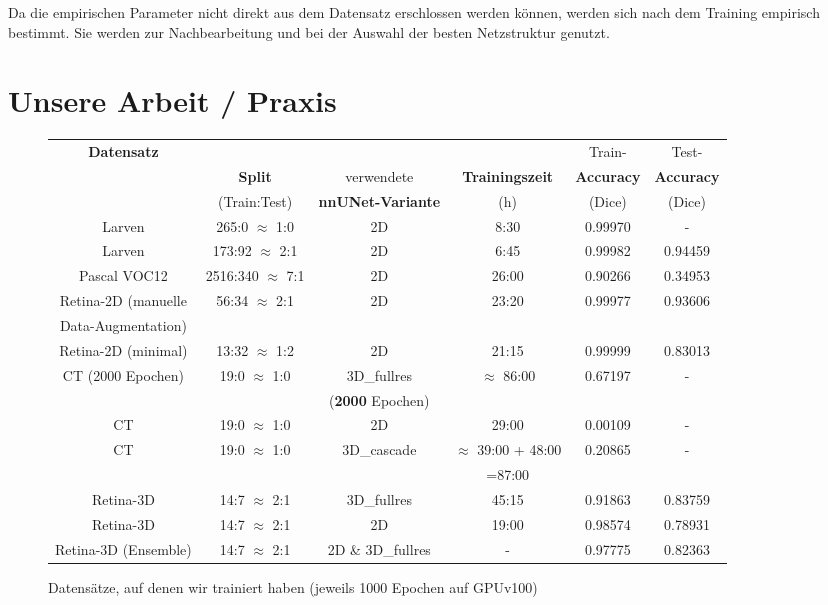 Da die empirischen Parameter nicht direkt aus dem Datensatz erschlossen werden können, werden sich nach dem Training empirisch bestimmt. Sie werden zur Nachbearbeitung und bei der Auswahl der besten Netzstruktur genutzt. 


\section{Unsere Arbeit / Praxis}
\begin{figure}[H]
\begin{tabular}{|c|c|c|c|c|c|}
\hline 
\multirow{3}{*}{\textbf{Datensatz}} &  &  & & Train-& Test- \\ 
 & \textbf{Split} & verwendete & \textbf{Trainingszeit} & \textbf{Accuracy}& \textbf{Accuracy} \\ 
 & (Train:Test) & \textbf{nnUNet-Variante} & (h) & (Dice)& (Dice)  \\ 
\hline 
\hline
Larven \cite{larven} & 265:0 $\approx$ 1:0 & 2D & 8:30 & 0.99970 & - \\ 
\hline 
Larven \cite{larven}& 173:92 $\approx$ 2:1 & 2D & 6:45 & 0.99982 & 0.94459 \\ 
\hline 
Pascal VOC12 \cite{PascalVOCDatensatz}& 2516:340 $\approx$ 7:1 & 2D & 26:00 & 0.90266 & 0.34953 \\ 
\hline 
Retina-2D \cite{retina2d} (manuelle & \multirow{2}{*}{56:34 $\approx$ 2:1} & \multirow{2}{*}{2D} & \multirow{2}{*}{23:20} & \multirow{2}{*}{0.99977} &\multirow{2}{*}{0.93606}  \\ 
Data-Augmentation)&  & & & &  \\ 
\hline 
Retina-2D \cite{retina2d} (minimal) & 13:32 $\approx$ 1:2 & 2D & 21:15 & 0.99999 &  0.83013 \\ 
\hline 
\multirow{2}{*}{CT \cite{ctDatensatz} (2000 Epochen)} & \multirow{2}{*}{19:0 $\approx$ 1:0} & 3D\_fullres & \multirow{2}{*}{$\approx$ 86:00}  & \multirow{2}{*}{0.67197} & \multirow{2}{*}{-} \\ 
 &  & (\textbf{2000} Epochen) & &  &  \\ 
\hline 
CT \cite{ctDatensatz} & 19:0 $\approx$ 1:0 & 2D & 29:00 & 0.00109 & - \\ 
\hline 
\multirow{2}{*}{CT \cite{ctDatensatz}} & \multirow{2}{*}{19:0 $\approx$ 1:0} & \multirow{2}{*}{3D\_cascade} & $\approx$ 39:00 + 48:00 & \multirow{2}{*}{0.20865} & \multirow{2}{*}{-} \\ 
 &  &  & =87:00 &  & \\ 
\hline 
Retina-3D \cite{retina3dDatensatz} & 14:7 $\approx$ 2:1 & 3D\_fullres & 45:15 & 0.91863 & 0.83759 \\ 
\hline 
Retina-3D \cite{retina3dDatensatz} & 14:7 $\approx$ 2:1  & 2D & 19:00 & 0.98574 & 0.78931 \\ 
\hline 
Retina-3D \cite{retina3dDatensatz} (Ensemble) & 14:7 $\approx$ 2:1 & 2D \& 3D\_fullres & - & 0.97775 & 0.82363 \\ 
\hline
\end{tabular} 
\caption{Datensätze, auf denen wir trainiert haben (jeweils 1000 Epochen auf GPUv100)}
\label{tab:Training}
\end{figure}

